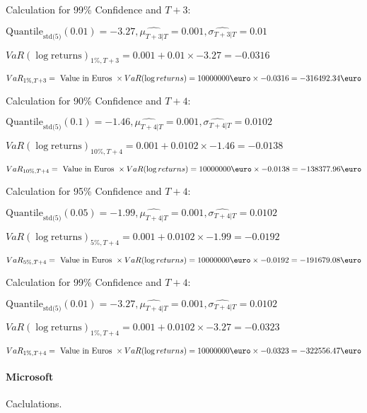 Calculation for 99\% Confidence and $T+3$:

\indent\indent $\text{Quantile}_\text{std(5)}(0.01) = -3.27,\hat{\mu_{T+3|T}} = 0.001, \hat{\sigma_{T+3|T}} = 0.01$

\indent\indent $VaR(\log \text{returns})_{1\%, T + 3} = 0.001 + 0.01\times-3.27 = -0.0316$

\indent\indent $VaR_{1\%, T + 3} = \text{ Value in Euros } \times VaR(\log returns) = 10 000 000 \text{\euro} \times-0.0316 = -316492.34 \text{\euro}$\newline




Calculation for 90\% Confidence and $T+4$:

\indent\indent $\text{Quantile}_\text{std(5)}(0.1) = -1.46,\hat{\mu_{T+4|T}} = 0.001, \hat{\sigma_{T+4|T}} = 0.0102$

\indent\indent $VaR(\log \text{returns})_{10\%, T + 4} = 0.001 + 0.0102\times-1.46 = -0.0138$

\indent\indent $VaR_{10\%, T + 4} = \text{ Value in Euros } \times VaR(\log returns) = 10 000 000 \text{\euro} \times-0.0138 = -138377.96 \text{\euro}$\newline




Calculation for 95\% Confidence and $T+4$:

\indent\indent $\text{Quantile}_\text{std(5)}(0.05) = -1.99,\hat{\mu_{T+4|T}} = 0.001, \hat{\sigma_{T+4|T}} = 0.0102$

\indent\indent $VaR(\log \text{returns})_{5\%, T + 4} = 0.001 + 0.0102\times-1.99 = -0.0192$

\indent\indent $VaR_{5\%, T + 4} = \text{ Value in Euros } \times VaR(\log returns) = 10 000 000 \text{\euro} \times-0.0192 = -191679.08 \text{\euro}$\newline




Calculation for 99\% Confidence and $T+4$:

\indent\indent $\text{Quantile}_\text{std(5)}(0.01) = -3.27,\hat{\mu_{T+4|T}} = 0.001, \hat{\sigma_{T+4|T}} = 0.0102$

\indent\indent $VaR(\log \text{returns})_{1\%, T + 4} = 0.001 + 0.0102\times-3.27 = -0.0323$

\indent\indent $VaR_{1\%, T + 4} = \text{ Value in Euros } \times VaR(\log returns) = 10 000 000 \text{\euro} \times-0.0323 = -322556.47 \text{\euro}$\newline
\paragraph{Microsoft} Caclulations.\newline \indent 





